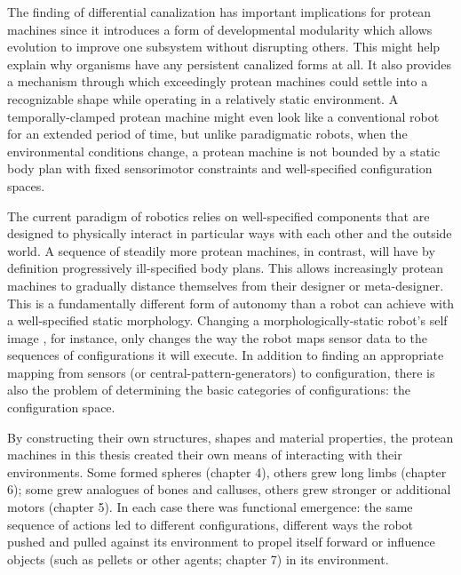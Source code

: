 The finding of differential canalization has important implications
for protean machines since it introduces a form of developmental modularity
which
allows evolution to improve one subsystem without disrupting others.
This might help explain why organisms have any persistent canalized forms at all.
It also provides a mechanism through which exceedingly protean machines could settle into a recognizable shape while operating in a relatively static environment.
A temporally-clamped protean machine might even look like a conventional robot for an extended period of time, but unlike paradigmatic robots, when the environmental conditions change, a protean machine is not bounded by a static body plan with fixed sensorimotor constraints and well-specified configuration spaces.

The current paradigm of robotics relies on well-specified components that are designed to physically interact in particular ways with each other and the outside world.
A sequence of steadily more protean machines, in contrast, will have by definition progressively ill-specified body plans.
This allows increasingly protean machines to gradually distance themselves from their designer or meta-designer.
This is a fundamentally different form of autonomy than a robot can achieve with a well-specified static morphology.
Changing a morphologically-static robot's self image \cite{bongard2006resilient,cully2015robots}, for instance, 
only changes the way the robot maps sensor data to 
the sequences of configurations it will execute.
In addition to finding an appropriate mapping from sensors (or central-pattern-generators) to configuration, 
there is also the problem of determining the basic categories of configurations: the configuration space.

By constructing their own structures, shapes and material properties, 
the protean machines in this thesis created their own means of interacting with their environments.
Some formed spheres (chapter 4), others grew long limbs (chapter 6); 
some grew analogues of bones and calluses, others grew stronger or additional motors (chapter 5).
In each case there was functional emergence: 
the same sequence of actions led to different configurations, different ways the robot pushed and pulled against its environment to propel itself forward or influence objects (such as pellets or other agents; chapter 7) in its environment.



